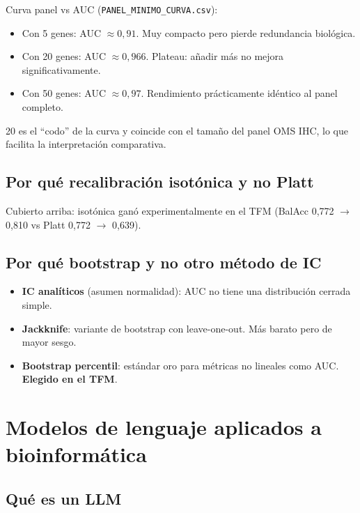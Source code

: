 \documentclass[11pt, a4paper]{article}
\begin{document}
Curva panel vs AUC (\texttt{PANEL\_MINIMO\_CURVA.csv}):

\begin{itemize}[leftmargin=1.2em]
  \item Con 5 genes: AUC $\approx 0{,}91$. Muy compacto pero pierde
  redundancia biol\'ogica.
  \item Con 20 genes: AUC $\approx 0{,}966$. Plateau: a\~nadir m\'as no
  mejora significativamente.
  \item Con 50 genes: AUC $\approx 0{,}97$. Rendimiento pr\'acticamente
  id\'entico al panel completo.
\end{itemize}

20 es el ``codo'' de la curva y coincide con el tama\~no del panel OMS
IHC, lo que facilita la interpretaci\'on comparativa.

\subsection{Por qu\'e recalibraci\'on isot\'onica y no Platt}

Cubierto arriba: isot\'onica gan\'o experimentalmente en el TFM
(BalAcc 0,772 $\to$ 0,810 vs Platt 0,772 $\to$ 0,639).

\subsection{Por qu\'e bootstrap y no otro m\'etodo de IC}

\begin{itemize}[leftmargin=1.2em]
  \item \textbf{IC anal\'iticos} (asumen normalidad): AUC no tiene una
  distribuci\'on cerrada simple.
  \item \textbf{Jackknife}: variante de bootstrap con leave-one-out.
  M\'as barato pero de mayor sesgo.
  \item \textbf{Bootstrap percentil}: est\'andar oro para m\'etricas
  no lineales como AUC. \textbf{Elegido en el TFM}.
\end{itemize}

\section{Modelos de lenguaje aplicados a bioinform\'atica}

\subsection{Qu\'e es un LLM}
\end{document}
